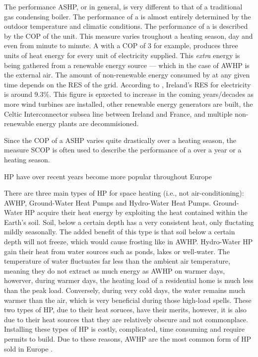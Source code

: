 The performance \acs{ASHP}, or \HPs in general, is very different to that of a traditional gas condensing boiler. The performance of a \HP is almost entirely determined by the outdoor temperature and climatic conditions. The performance of a \HP is described by the \ac{COP} of the unit. This measure varies troughout a heating season, day and even from minute to minute. A \HP with a \ac{COP} of 3 for example, produces three units of heat energy for every unit of electricity supplied. This \textit{extra} energy is being gathered from a renewable energy source --- which in the case of \acs{AWHP} is the external air. The amount of non-renewable energy consumed by \HP at any given time depends on the \ac{RES} of the grid. According to \citeauthor{seai_2020}, Ireland's \ac{RES} for electricity is around 9.3\%. This figure is epxected to increase in the coming years/decades as more wind turbines are installed, other renewable energy generators are built, the Celtic Interconnector subsea line between Ireland and France, and multiple non-renewable energy plants are decommisioned.

Since the \ac{COP} of a \ac{ASHP} varies quite drastically over a heating season, the measure \ac{SCOP} is often used to describe the performance of a \AWHP over a year or a heating season. 




\acs{HP} have over recent years become more popular throughout Europe 

There are three main types of \acs{HP} for space heating (i.e., not air-conditioning): \acs{AWHP}, Ground-Water Heat Pumps and Hydro-Water Heat Pumps. Ground-Water \acs{HP} acquire their heat energy by exploiting the heat contained within the Earth's soil. Soil, below a certain depth has a very consistent heat, only fluctating mildly seasonally. The added benefit of this type is that soil below a certain depth will not freeze, which would cause frosting like in \acs{AWHP}. Hydro-Water \acs{HP} gain their heat from water sources such as ponds, lakes or well-water. The temperature of water fluctuates far less than the ambient air temperature, meaning they do not extract as much energy as \acs{AWHP} on warmer days, howerver, during warmer days, the heating load of a residential home is much less than the peak load. Conversely, during very cold days, the water remains much warmer than the air, which is very beneficial during those high-load spells. These two types of \acs{HP}, due to their heat soruces, have their merits, however, it is also due to their heat sources that they are relatively obscure and not commonplace. Installing these types of \acs{HP} is costly, complicated, time consuming and require permits to build. Due to these reasons, \acs{AWHP} are the most common form of \ac{HP} sold in Europe \cite{ehpa_2015}.  

